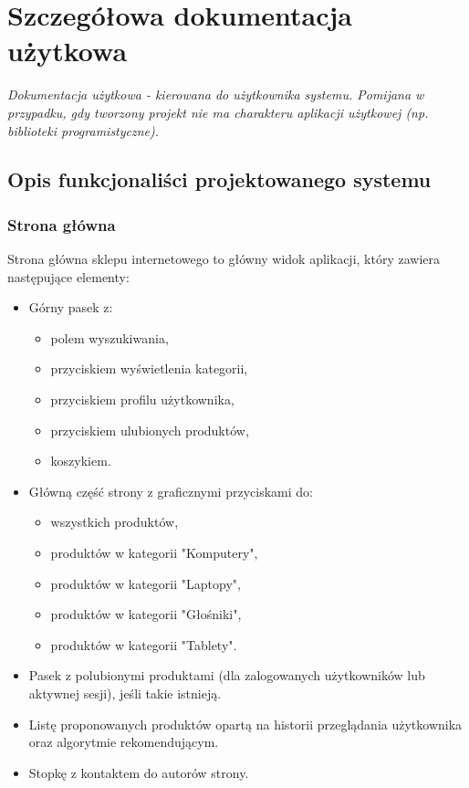 \documentclass[12pt,a4paper,oneside]{article}
\theoremstyle{definition}
\numberwithin{equation}{section}
\begin{document}
\tableofcontents


\newpage

\section{Szczegółowa dokumentacja użytkowa}
\textit{Dokumentacja użytkowa - kierowana do użytkownika systemu. Pomijana w przypadku, gdy tworzony projekt nie ma charakteru aplikacji użytkowej (np. biblioteki programistyczne).} 
\subsection{Opis funkcjonaliści projektowanego systemu}


\subsubsection{Strona główna}
Strona główna  sklepu internetowego to główny widok aplikacji, który zawiera następujące elementy:
\begin{itemize}
    \item Górny pasek z:
    \begin{itemize}
        \item polem wyszukiwania,
        \item przyciskiem wyświetlenia kategorii,
        \item przyciskiem profilu użytkownika,
        \item przyciskiem ulubionych produktów,
        \item koszykiem.
    \end{itemize}
    \item Główną część strony z graficznymi przyciskami do:
    \begin{itemize}
        \item wszystkich produktów,
        \item produktów w kategorii "Komputery",
        \item produktów w kategorii "Laptopy",
        \item produktów w kategorii "Głośniki",
        \item produktów w kategorii "Tablety".
    \end{itemize}
    \item Pasek z polubionymi produktami (dla zalogowanych użytkowników lub aktywnej sesji), jeśli takie istnieją.
    \item Listę proponowanych produktów opartą na historii przeglądania użytkownika oraz algorytmie rekomendującym.
    \item Stopkę z kontaktem do autorów strony.
\end{itemize}
\end{document}
